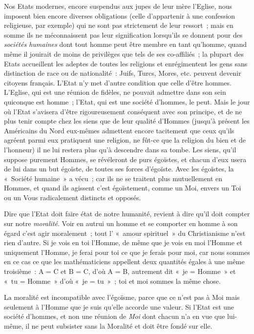 \documentclass[french,twoside]{book} %
\begin{document}
Nos Etats modernes, encore suspendus aux jupes de leur mère l’Eglise, nous imposent bien encore diverses obligations (celle d’appartenir à une confession religieuse, par exemple) qui ne sont pas strictement de leur ressort ; mais en somme ils ne méconnaissent pas leur signification lorsqu’ils se donnent pour des \emph{sociétés humaines} dont tout homme peut être membre en tant qu’homme, quand même il jouirait de moins de privilèges que tels de ses co-affiliés ; la plupart des Etats accueillent les adeptes de toutes les religions et enrégimentent les gens sans distinction de race ou de nationalité : Juifs, Turcs, Mores, etc. peuvent devenir citoyens français. L’Etat n’y met d’autre condition que celle d’être hommes. L’Eglise, qui est une réunion de fidèles, ne pouvait admettre dans son sein quiconque est homme ; l’Etat, qui est une société d’hommes, le peut. Mais le jour où l’Etat s’avisera d’être rigoureusement conséquent avec son principe, et de ne plus tenir compte chez les siens que de leur qualité d’Hommes (jusqu’à présent les Américains du Nord eux-mêmes admettent encore tacitement que ceux qu’ils agréent parmi eux pratiquent une religion, ne fût-ce que la religion du bien et de l’honneur) il ne lui restera plus qu’à descendre dans sa tombe. Les siens, qu’il suppose purement Hommes, se révéleront de purs égoïstes, et chacun d’eux usera de lui dans un but égoïste, de toutes ses forces d’égoïste. Avec les égoïstes, la « Société humaine » a vécu ; car ils ne se traitent plus mutuellement en Hommes, et quand ils agissent c’est égoïstement, comme un Moi, envers un Toi ou un Vous radicalement distincts et opposés.\par
 Dire que l’Etat doit faire état de notre humanité, revient à dire qu’il doit compter sur notre \emph{moralité}. Voir en autrui un homme et se comporter en homme à son égard c’est agir moralement ; tout l’ « amour spirituel » du Christianisme n’est rien d’autre. Si je vois en toi l’Homme, de même que je vois en moi l’Homme et uniquement l’Homme, je ferai pour toi ce que je ferais pour moi, car nous sommes en ce cas ce que les mathématiciens appellent deux quantités égales à une même troisième : A = C et B = C, d’où A = B, autrement dit « je = Homme » et « tu = Homme » d’où « je = tu » ; toi et moi sommes la même chose.\par
La moralité est incompatible avec l’égoïsme, parce que ce n’est pas à Moi mais seulement à l’Homme que je suis qu’elle accorde une valeur. Si l’Etat est une société d’hommes, et non une réunion de \emph{Moi }dont chacun n’a en vue que lui-même, il ne peut subsister sans la Moralité et doit être fondé sur elle.\par
\end{document}
